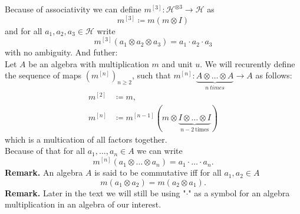 \documentclass[a4paper, 12pt]{report}
\begin{document}
\indent  Because of associativity we can define $m^{[3]} : \mathcal{H}^{\otimes 3} \to \mathcal{H}$ as
\begin{equation*}
m^{[3]} \coloneqq m(m\otimes I)
\end{equation*}
and for all $a_1, a_2, a_3 \in \mathcal{H}$ write
\begin{equation*}
m^{[3]}(a_1 \otimes a_2 \otimes a_3) = a_1 \cdot a_2 \cdot a_3
\end{equation*}
with no ambiguity.
And futher: \\
\indent Let $A$ be an algebra with multiplication $m$ and unit $u$. We will recurently define the
sequence of maps
$(m^{[n]})_{n \geq 2}$, such that $m^{[n]} : \underbrace{A \otimes \dots \otimes A}_{n\ times} \to A$
as follows:
\begin{align*}
m^{[2]} &\coloneqq m, \\
m^{[n]} &\coloneqq m^{[n-1]}(m \otimes \underbrace{I \otimes \dots \otimes I}_{n-2 \mathrm{\ times}})
\end{align*}
which is a multication of all factors together. \\
Because of that for all $a_1, \dots, a_n \in A$ we can write
\begin{equation*}
m^{[n]}(a_1 \otimes \dots \otimes a_n) = a_1 \cdot \ldots \cdot a_n.
\end{equation*}
\textbf{Remark. } An algebra $A$ is said to be commutative iff for all $a_1, a_2 \in A$
\begin{equation*}
m(a_1 \otimes a_2 ) = m(a_2 \otimes a_1).
\end{equation*}
\indent \textbf{Remark. } Later in the text we will still be using "$\cdot$" as a symbol for an algebra
multiplication in an algebra of our interest.
\end{document}
